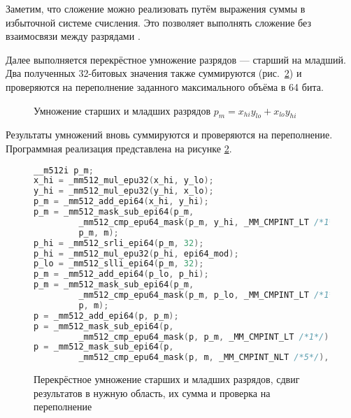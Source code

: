 Заметим, что сложение можно реализовать путём выражения суммы в избыточной системе счисления.
Это позволяет выполнять сложение без взаимосвязи между разрядами \cite{ChusovLychev}.

Далее выполняется перекрёстное умножение разрядов --- старший на младший.
Два полученных 32-битовых значения также суммируются (рис.~\ref{fig: vector cross-lane multiplication}) и проверяются на переполнение заданного максимального объёма в 64 бита.
\begin{figure}[ht]
\centering
\caption{Умножение старших и младших разрядов $p_m = x_{hi} y_{lo} + x_{lo} y_{hi}$}
\label{fig: vector horizontal operation example}
\end{figure}
Результаты умножений вновь суммируются и проверяются на переполнение.
Программная реализация представлена на рисунке \ref{fig: vector cross-lane multiplication}.
\begin{figure}[ht]
\centering
\begin{lstlisting}[language=C]
__m512i p_m;
x_hi = _mm512_mul_epu32(x_hi, y_lo);
y_hi = _mm512_mul_epu32(y_hi, x_lo);
p_m = _mm512_add_epi64(x_hi, y_hi);
p_m = _mm512_mask_sub_epi64(p_m,
         _mm512_cmp_epu64_mask(p_m, y_hi, _MM_CMPINT_LT /*1*/),
         p_m, m);
p_hi = _mm512_srli_epi64(p_m, 32);
p_hi = _mm512_mul_epu32(p_hi, epi64_mod);
p_lo = _mm512_slli_epi64(p_m, 32);
p_m = _mm512_add_epi64(p_lo, p_hi);
p_m = _mm512_mask_sub_epi64(p_m,
         _mm512_cmp_epu64_mask(p_m, p_lo, _MM_CMPINT_LT /*1*/),
         p, m);
p = _mm512_add_epi64(p, p_m);
p = _mm512_mask_sub_epi64(p,
         _mm512_cmp_epu64_mask(p, p_m, _MM_CMPINT_LT /*1*/), p, m);
p = _mm512_mask_sub_epi64(p,
         _mm512_cmp_epu64_mask(p, m, _MM_CMPINT_NLT /*5*/), p, m);
\end{lstlisting}
\caption{Перекрёстное умножение старших и младших разрядов, сдвиг результатов в нужную область, их сумма и проверка на переполнение}
\label{fig: vector cross-lane multiplication}
\end{figure}

